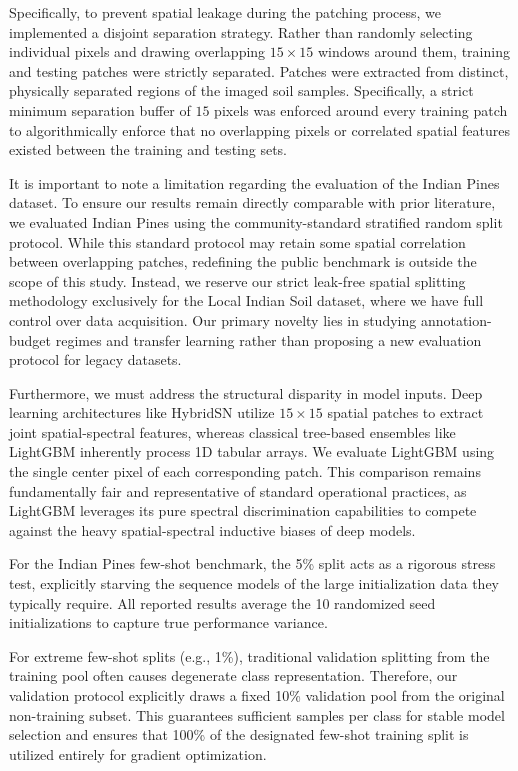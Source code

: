 \documentclass[pdflatex,sn-mathphys-num,iicol]{sn-jnl}
\begin{document}
Specifically, to prevent spatial leakage during the patching process, we implemented a disjoint separation strategy. Rather than randomly selecting individual pixels and drawing overlapping $15\times15$ windows around them, training and testing patches were strictly separated. Patches were extracted from distinct, physically separated regions of the imaged soil samples. Specifically, a strict minimum separation buffer of $15$ pixels was enforced around every training patch to algorithmically enforce that no overlapping pixels or correlated spatial features existed between the training and testing sets.

It is important to note a limitation regarding the evaluation of the Indian Pines dataset. To ensure our results remain directly comparable with prior literature, we evaluated Indian Pines using the community-standard stratified random split protocol. While this standard protocol may retain some spatial correlation between overlapping patches, redefining the public benchmark is outside the scope of this study. Instead, we reserve our strict leak-free spatial splitting methodology exclusively for the Local Indian Soil dataset, where we have full control over data acquisition. Our primary novelty lies in studying annotation-budget regimes and transfer learning rather than proposing a new evaluation protocol for legacy datasets.

Furthermore, we must address the structural disparity in model inputs. Deep learning architectures like HybridSN utilize $15\times15$ spatial patches to extract joint spatial-spectral features, whereas classical tree-based ensembles like LightGBM inherently process 1D tabular arrays. We evaluate LightGBM using the single center pixel of each corresponding patch. This comparison remains fundamentally fair and representative of standard operational practices, as LightGBM leverages its pure spectral discrimination capabilities to compete against the heavy spatial-spectral inductive biases of deep models.

For the Indian Pines few-shot benchmark, the 5\% split acts as a rigorous stress test, explicitly starving the sequence models of the large initialization data they typically require. All reported results average the 10 randomized seed initializations to capture true performance variance.

For extreme few-shot splits (e.g., 1\%), traditional validation splitting from the training pool often causes degenerate class representation. Therefore, our validation protocol explicitly draws a fixed 10\% validation pool from the original non-training subset. This guarantees sufficient samples per class for stable model selection and ensures that 100\% of the designated few-shot training split is utilized entirely for gradient optimization.
\end{document}
